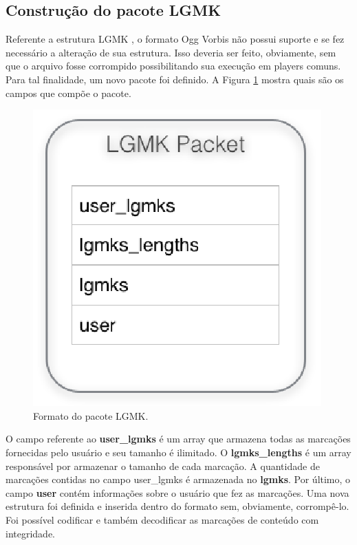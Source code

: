 \subsection{Construção do pacote LGMK}

Referente a estrutura LGMK \cite{herbert}, o formato Ogg Vorbis não possui suporte e se fez necessário a alteração de sua estrutura. Isso deveria ser feito, obviamente, sem que o arquivo fosse corrompido possibilitando sua execução em players comuns. Para tal finalidade, um novo pacote foi definido. A Figura \ref{lgmk} mostra quais são os campos que compõe o pacote.

 \begin{figure}[ht]
	\centering
		\includegraphics[keepaspectratio=true,scale=0.8]{figuras/lgmks.eps}
	\caption{Formato do pacote LGMK.}
	\label{lgmk}
\end{figure}

O campo referente ao \textbf{user\_lgmks} é um array que armazena todas as marcações fornecidas pelo usuário e seu tamanho é ilimitado. O \textbf{lgmks\_lengths} é um array responsável por armazenar o tamanho de cada marcação. A quantidade de marcações contidas no campo user\_lgmks é armazenada no \textbf{lgmks}. Por último, o campo \textbf{user} contém informações sobre o usuário que fez as marcações. Uma nova estrutura foi definida e inserida dentro do formato sem, obviamente, corrompê-lo. Foi possível codificar e também decodificar as marcações de conteúdo com integridade.

